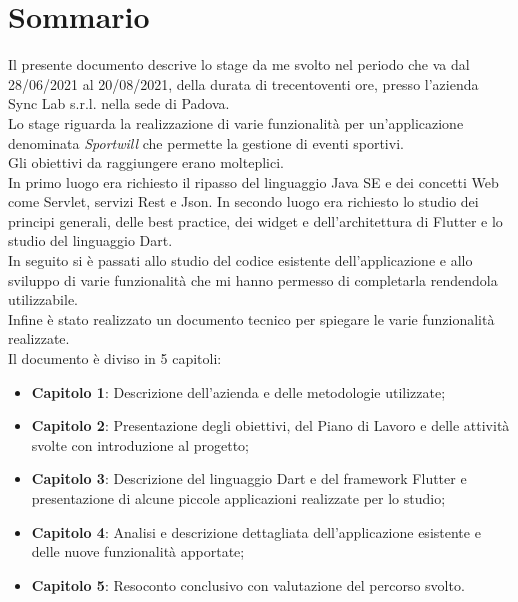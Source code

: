 
\cleardoublepage
{}
{}
\begingroup
\let\clearpage\relax
\let\cleardoublepage\relax
\let\cleardoublepage\relax

\chapter*{Sommario}

Il presente documento descrive lo stage da me svolto nel periodo che va dal 28/06/2021 al 20/08/2021, della durata di trecentoventi ore, presso l'azienda Sync Lab s.r.l. nella sede di Padova.\\
Lo stage riguarda la realizzazione di varie funzionalità per un'applicazione denominata \textit{Sportwill} che permette la gestione di eventi sportivi.\\
Gli obiettivi da raggiungere erano molteplici.\\
In primo luogo era richiesto il ripasso del linguaggio Java SE e dei concetti Web come Servlet, servizi Rest e Json.
In secondo luogo era richiesto lo studio dei principi generali, delle best practice, dei widget e dell'architettura di Flutter e lo studio del linguaggio Dart.\\
In seguito si è passati allo studio del codice esistente dell'applicazione e allo sviluppo di varie funzionalità che mi hanno permesso di completarla rendendola utilizzabile.\\
Infine è stato realizzato un documento tecnico per spiegare le varie funzionalità realizzate.\\
Il documento è diviso in 5 capitoli:
\begin{itemize}
	\item \textbf{Capitolo 1}: Descrizione dell'azienda e delle metodologie utilizzate; \\
	\item \textbf{Capitolo 2}: Presentazione degli obiettivi, del Piano di Lavoro e delle attività svolte con introduzione al progetto; \\
	\item \textbf{Capitolo 3}: Descrizione del linguaggio Dart e del framework Flutter e presentazione di alcune piccole applicazioni realizzate per lo studio; \\
	\item \textbf{Capitolo 4}: Analisi e descrizione dettagliata dell'applicazione esistente e delle nuove funzionalità apportate; \\
	\item \textbf{Capitolo 5}: Resoconto conclusivo con valutazione del percorso svolto. \\
\end{itemize}

%
%

\endgroup			

\vfill

